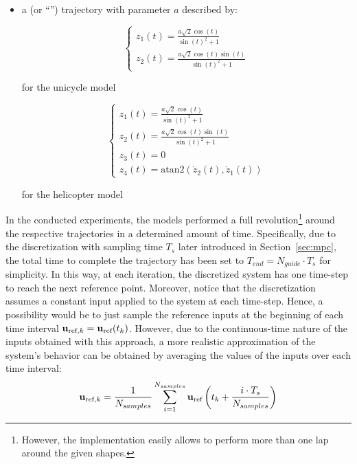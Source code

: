 \documentclass[../main.tex]{subfiles}
\begin{document}
\begin{itemize}
	\item a  (or ``'') trajectory with
		parameter $a$ described by:
		\vspace{-0.1cm}
		\begin{multicols}{2}
			\begin{equation*}
				\begin{cases}
					z_1(t) = \frac{a \sqrt{2} \cos(t)}{\sin(t)^2 + 1}\\
					z_2(t) = \frac{a \sqrt{2} \cos(t) \sin(t)}{\sin(t)^2 + 1}
				\end{cases}
			\end{equation*}
			\begin{center}
				for the unicycle model\\
			\end{center}
		\columnbreak
			\begin{equation*}
				\begin{cases}
					z_1(t) = \frac{a \sqrt{2} \cos(t)}{\sin(t)^2 + 1}\\
					z_2(t) = \frac{a \sqrt{2} \cos(t) \sin(t)}{\sin(t)^2 + 1}\\
					z_3(t) = 0\\
					z_4(t) = \text{atan2}\left(\dot{z}_2(t), \dot{z}_1(t)\right)
				\end{cases}
			\end{equation*}
			\begin{center}
				for the helicopter model
			\end{center}
		\end{multicols}

\end{itemize}

In the conducted experiments, the models performed a full
revolution\footnote{However, the implementation easily allows to perform more than one
lap around the given shapes.} around the respective trajectories in a determined amount of
time.
Specifically, due to the discretization with sampling time $T_s$ later introduced in Section~\ref{sec:mpc}, the total time to complete the
trajectory has been set to
$T_{end} = N_{guide} \cdot T_s$ for simplicity. In this way, at each iteration,
the discretized system has one time-step to reach the next reference point.
Moreover, notice that the discretization assumes a constant input applied to
the system at each time-step. Hence, a possibility would be to just sample the
reference inputs at the beginning of each time interval $\mathbf{u}_{\text{ref}, k} =
\mathbf{u}_{\text{ref}}(t_k)$. However, due to the continuous-time nature of the 
inputs obtained with this approach, a more realistic approximation of the
system's behavior can be obtained by averaging the values of the inputs over
each time interval:
\begin{equation*}
	\mathbf{u}_{\text{ref}, k} = \frac{1}{N_{samples}} \sum_{i=1}^{N_{samples}}
	\mathbf{u}_{\text{ref}}\left(t_k + \frac{i
	\cdot T_s}{N_{samples}} \right)
\end{equation*}
\end{document}
